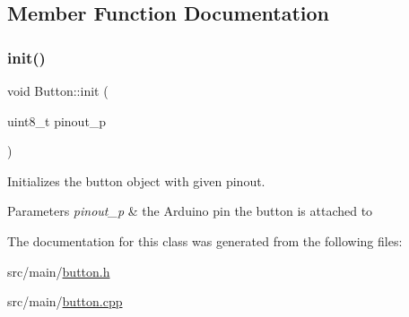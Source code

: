 \subsection{Member Function Documentation}
\mbox{\label{class_button_a5768906065b7f1d4d146f1d9fc5ce890}} 
\subsubsection{\texorpdfstring{init()}{init()}}
{\footnotesize\ttfamily void Button\+::init (\begin{DoxyParamCaption}\item[{uint8\+\_\+t}]{pinout\+\_\+p }\end{DoxyParamCaption})}



Initializes the button object with given pinout. 


\begin{DoxyParams}{Parameters}
{\em pinout\+\_\+p} & the Arduino pin the button is attached to \\
\hline
\end{DoxyParams}


The documentation for this class was generated from the following files\+:\begin{DoxyCompactItemize}
\item 
src/main/\hyperlink{button_8h}{button.\+h}\item 
src/main/\hyperlink{button_8cpp}{button.\+cpp}\end{DoxyCompactItemize}
